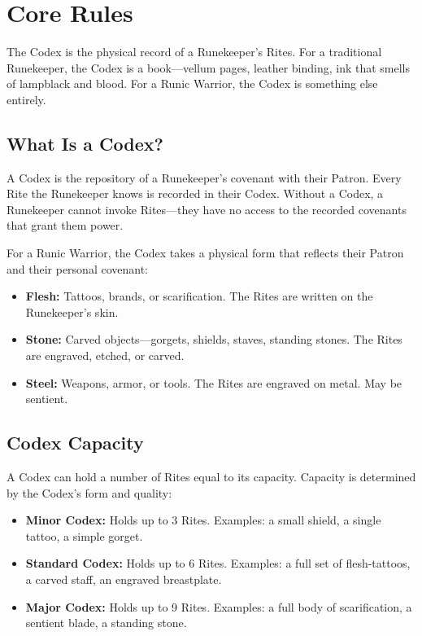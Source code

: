 \section{Core Rules}

The Codex is the physical record of a Runekeeper's Rites. For a traditional Runekeeper, the Codex is a book—vellum pages, leather binding, ink that smells of lampblack and blood. For a Runic Warrior, the Codex is something else entirely.

\subsection{What Is a Codex?}

A Codex is the repository of a Runekeeper's covenant with their Patron. Every Rite the Runekeeper knows is recorded in their Codex. Without a Codex, a Runekeeper cannot invoke Rites—they have no access to the recorded covenants that grant them power.

For a Runic Warrior, the Codex takes a physical form that reflects their Patron and their personal covenant:

\begin{itemize}
\item \textbf{Flesh:} Tattoos, brands, or scarification. The Rites are written on the Runekeeper's skin.
\item \textbf{Stone:} Carved objects—gorgets, shields, staves, standing stones. The Rites are engraved, etched, or carved.
\item \textbf{Steel:} Weapons, armor, or tools. The Rites are engraved on metal. May be sentient.
\end{itemize}

\subsection{Codex Capacity}

A Codex can hold a number of Rites equal to its capacity. Capacity is determined by the Codex's form and quality:

\begin{itemize}
\item \textbf{Minor Codex:} Holds up to 3 Rites. Examples: a small shield, a single tattoo, a simple gorget.
\item \textbf{Standard Codex:} Holds up to 6 Rites. Examples: a full set of flesh-tattoos, a carved staff, an engraved breastplate.
\item \textbf{Major Codex:} Holds up to 9 Rites. Examples: a full body of scarification, a sentient blade, a standing stone.
\end{itemize}


